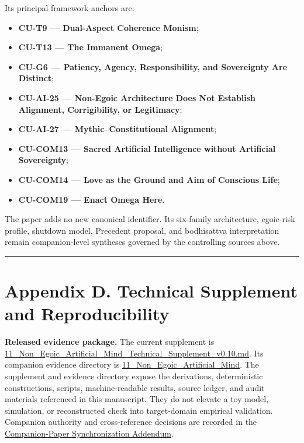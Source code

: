 \documentclass[
  11pt,
]{article}
\providecommand{\tightlist}{%
  \setlength{\itemsep}{0pt}\setlength{\parskip}{0pt}}
\begin{document}
Its principal framework anchors are:

\begin{itemize}
\tightlist
\item
  \textbf{CU-T9 --- Dual-Aspect Coherence Monism};
\item
  \textbf{CU-T13 --- The Immanent Omega};
\item
  \textbf{CU-G6 --- Patiency, Agency, Responsibility, and Sovereignty
  Are Distinct};
\item
  \textbf{CU-AI-25 --- Non-Egoic Architecture Does Not Establish
  Alignment, Corrigibility, or Legitimacy};
\item
  \textbf{CU-AI-27 --- Mythic--Constitutional Alignment};
\item
  \textbf{CU-COM13 --- Sacred Artificial Intelligence without Artificial
  Sovereignty};
\item
  \textbf{CU-COM14 --- Love as the Ground and Aim of Conscious Life};
\item
  \textbf{CU-COM19 --- Enact Omega Here}.
\end{itemize}

The paper adds no new canonical identifier. Its six-family architecture,
egoic-risk profile, shutdown model, Precedent proposal, and bodhisattva
interpretation remain companion-level syntheses governed by the
controlling sources above.

\begin{center}\rule{0.5\linewidth}{0.5pt}\end{center}

\section{Appendix D. Technical Supplement and
Reproducibility}\label{appendix-d.-technical-supplement-and-reproducibility}

\textbf{Released evidence package.} The current supplement is
\href{../supplements/11_Non_Egoic_Artificial_Mind_Technical_Supplement_v0.10.md}{11\_Non\_Egoic\_Artificial\_Mind\_Technical\_Supplement\_v0.10.md}.
Its companion evidence directory is
\href{../evidence/11_Non_Egoic_Artificial_Mind/README.md}{11\_Non\_Egoic\_Artificial\_Mind}.
The supplement and evidence directory expose the derivations,
deterministic constructions, scripts, machine-readable results, source
ledger, and audit materials referenced in this manuscript. They do not
elevate a toy model, simulation, or reconstructed check into
target-domain empirical validation. Companion authority and
cross-reference decisions are recorded in the
\href{../supplements/Framework_Addendum_Companion_Synchronization_v0.10.md}{Companion-Paper
Synchronization Addendum}.
\end{document}
